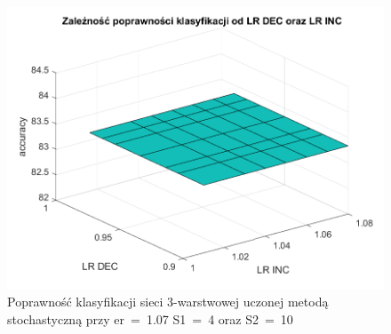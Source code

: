 \documentclass[12pt,twoside]{article}
\begin{document}
\begin{figure}[ht]
	\centering
	\includegraphics[width=16cm]{figures/Stoch_2.png}
	\caption{Poprawność klasyfikacji sieci 3-warstwowej uczonej metodą stochastyczną przy er~=~1.07 S1~=~4 oraz S2~=~10}
	\label{Fig:Stoch2}
\end{figure}


\clearpage
\end{document}
